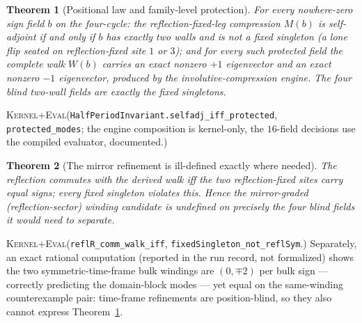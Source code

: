 \documentclass[11pt]{article}
\newcommand{\DraftTrust}{\textcolor{draftcolor}{\textsc{Kernel+Eval}}}
\newtheorem{theorem}{Theorem}
\begin{document}
\begin{theorem}[Positional law and family-level protection]\label{thm:law}
For every nowhere-zero sign field $b$ on the four-cycle: the
reflection-fixed-leg compression $M(b)$ is self-adjoint if and only if $b$
has exactly two walls and is not a fixed singleton (a lone flip seated on
reflection-fixed site $1$ or $3$); and for every such protected field the
\emph{complete} walk $W(b)$ carries an exact nonzero $+1$ eigenvector and
an exact nonzero $-1$ eigenvector, produced by the involutive-compression
engine.  The four blind two-wall fields are exactly the fixed singletons.
\end{theorem}
\noindent\DraftTrust{}\quad(\texttt{HalfPeriodInvariant.selfadj\_iff\_protected},
\texttt{protected\_modes}; the engine composition is kernel-only, the
$16$-field decisions use the compiled evaluator, documented.)

\begin{theorem}[The mirror refinement is ill-defined exactly where needed]
\label{thm:mirror}
The reflection commutes with the derived walk iff the two reflection-fixed
sites carry equal signs; every fixed singleton violates this.  Hence the
mirror-graded (reflection-sector) winding candidate is undefined on
precisely the four blind fields it would need to separate.
\end{theorem}
\noindent\DraftTrust{}\quad(\texttt{reflR\_comm\_walk\_iff},
\texttt{fixedSingleton\_not\_reflSym}.)  Separately, an exact
rational computation (reported in the run record, not formalized) shows the
two symmetric-time-frame bulk windings are $(0,\mp2)$ per bulk sign ---
correctly predicting the domain-block modes --- yet equal on the
same-winding counterexample pair: time-frame refinements are
position-blind, so they also cannot express Theorem~\ref{thm:law}.
\end{document}
